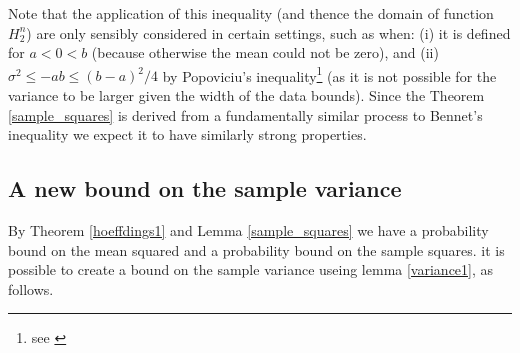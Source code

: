 Note that the application of this inequality (and thence the domain of function $H_2^n$) are only sensibly considered in certain settings, such as when:
(i) it is defined for $a<0<b$ (because otherwise the mean could not be zero), and (ii) $\sigma^2\le-ab\le (b-a)^2/4$ by Popoviciu's inequality\footnote{see \cite{zbMATH05780164}} (as it is not possible for the variance to be larger given the width of the data bounds).
Since the Theorem \ref{sample_squares} is derived from a fundamentally similar process to Bennet's inequality we expect it to have similarly strong properties.



\subsection{A new bound on the sample variance}\label{subsection:sample_variance_bound}

By Theorem \ref{hoeffdings1} and Lemma \ref{sample_squares} we have a probability bound on the mean squared and a probability bound on the sample squares. it is possible to create a bound on the sample variance useing lemma \ref{variance1}, as follows.



